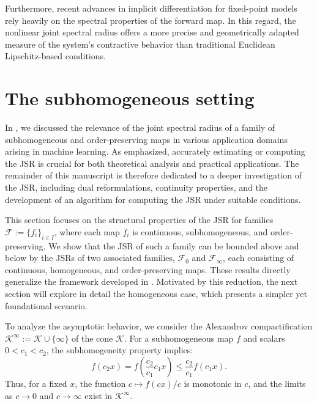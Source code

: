 \documentclass{article}
\newcommand{\family}{\mathcal{F}}
\newcommand{\cone}{\mathcal{K}}
\begin{document}
Furthermore, recent advances in implicit differentiation for fixed-point models \cite{fung2021fixed, revay2023lipconvnet} rely heavily on the spectral properties of the forward map. In this regard, the nonlinear joint spectral radius offers a more precise and geometrically adapted measure of the system’s contractive behavior than traditional Euclidean Lipschitz-based conditions. 



\section{The subhomogeneous setting}
\label{SEC:JSR_from_subhomogeneus_to_homogeneous}

In , we discussed the relevance of the joint spectral radius of a family of subhomogeneous and order-preserving maps in various application domains arising in machine learning. As emphasized, accurately estimating or computing the JSR is crucial for both theoretical analysis and practical applications. The remainder of this manuscript is therefore dedicated to a deeper investigation of the JSR, including dual reformulations, continuity properties, and the development of an algorithm for computing the JSR under suitable conditions.

This section focuses on the structural properties of the JSR for families $\family := \{f_i\}_{i \in I}$, where each map $f_i$ is continuous, subhomogeneous, and order-preserving. We show that the JSR of such a family can be bounded above and below by the JSRs of two associated families, $\family_0$ and $\family_{\infty}$, each consisting of continuous, homogeneous, and order-preserving maps. These results directly generalize the framework developed in \cite{cavalcante2019connections, auslender2006asymptotic}. Motivated by this reduction, the next section will explore in detail the homogeneous case, which presents a simpler yet foundational scenario.

To analyze the asymptotic behavior, we consider the Alexandrov compactification $\cone^{\infty} := \cone \cup \{\infty\}$ of the cone $\cone$. For a subhomogeneous map $f$ and scalars $0 < c_1 < c_2$, the subhomogeneity property implies:
\begin{equation}
    f(c_2 x) = f\left(\frac{c_2}{c_1} c_1 x \right) \leq \frac{c_2}{c_1} f(c_1 x).
\end{equation}
Thus, for a fixed $x$, the function $c \mapsto f(cx)/c$ is monotonic in $c$, and the limits as $c \to 0$ and $c \to \infty$ exist in $\cone^\infty$.
\end{document}
